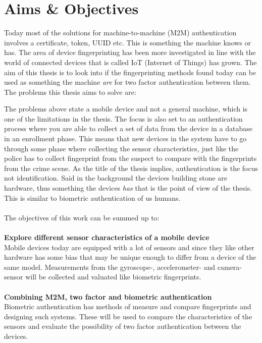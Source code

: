 \section{Aims \& Objectives}\label{sec:aim}
Today most of the solutions for machine-to-machine (M2M) authentication involves a certificate, token, UUID etc. This is something the machine knows or has. The area of device fingerprinting has been more investigated in line with the world of connected devices that is called IoT (Internet of Things) has grown. The aim of this thesis is to look into if the fingerprinting methods found today can be used as something the machine \textit{are} for two factor authentication between them. The problems this thesis aims to solve are:
The problems above state a mobile device and not a general machine, which is one of the limitations in the thesis. The focus is also set to an authentication process where you are able to collect a set of data from the device in a database in an enrollment phase. This means that new devices in the system have to go through some phase where collecting the sensor characteristics, just like the police has to collect fingerprint from the suspect to compare with the fingerprints from the crime scene. As the title of the thesis implies, authentication is the focus not identification. Said in the background the devices building stone are hardware, thus something the devices \textit{has} that is the point of view of the thesis. This is similar to biometric authentication of us humans. \\
\\
The objectives of this work can be summed up to:\\
\\
\textbf{Explore different sensor characteristics of a mobile device} \\
Mobile devices today are equipped with a lot of sensors and since they like other hardware has some bias that may be unique enough to differ from a device of the same model. Measurements from the gyroscope-, accelerometer- and camera-sensor will be collected and valuated like biometric fingerprints.\\
\\
\textbf{Combining M2M, two factor and biometric authentication} \\
Biometric authentication has methods of measure and compare fingerprints and designing such systems. These will be used to compare the characteristics of the sensors and evaluate the possibility of two factor authentication between the devices.

